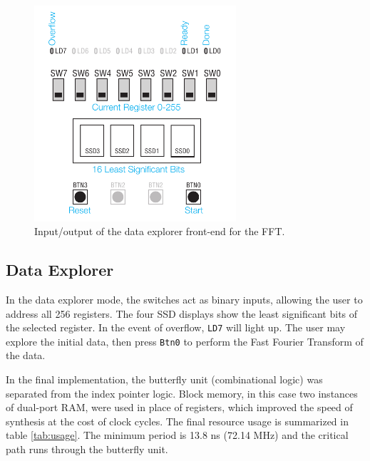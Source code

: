 \documentclass[twoside]{article}
\begin{document}
  \begin{figure}[h]
  \includegraphics[width=75mm]{images/nexys2io.pdf}
  \caption{Input/output of the data explorer front-end for the FFT.}  
  \label{fig:io}
  \end{figure}
  
  \subsection{Data Explorer}
  In the data explorer mode, the switches act as binary inputs, allowing the user to address all 256 registers. The four SSD
  displays show the least significant bits of the selected register. In the event of overflow, \lstinline!LD7! will light up.  The user
  may explore the initial data, then press \lstinline!Btn0! to perform the Fast Fourier Transform of the data.
  
  In the final implementation, the butterfly unit (combinational logic) was separated from the index pointer logic. Block memory, 
  in this case two instances of dual-port RAM, were used in place of registers, which improved the speed of synthesis at the
  cost of clock cycles.  The final resource usage is summarized in table \ref{tab:usage}. The minimum period is 13.8 ns (72.14 MHz)
  and the critical path runs through the butterfly unit.
  
\end{document}

